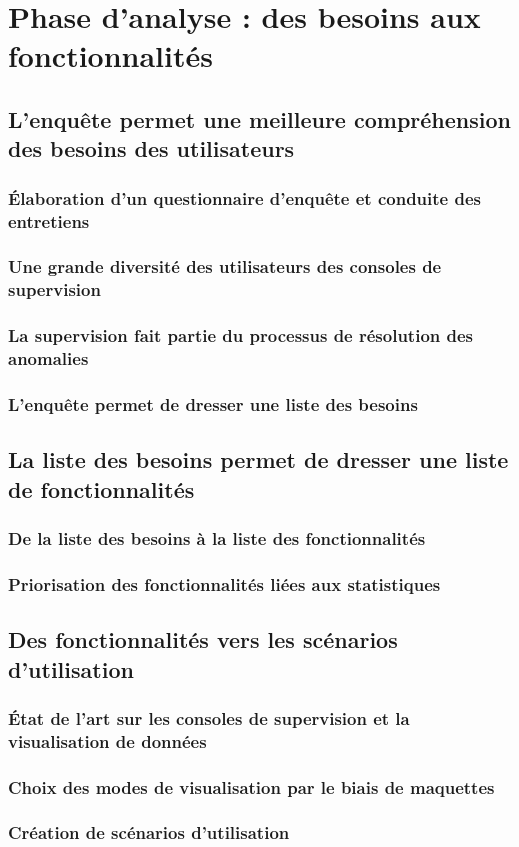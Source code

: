 \section{Phase d'analyse : des besoins aux fonctionnalités}

\subsection{L'enquête permet une meilleure compréhension des besoins des utilisateurs}
\subsubsection{Élaboration d'un questionnaire d'enquête et conduite des entretiens}
\subsubsection{Une grande diversité des utilisateurs des consoles de supervision}
\subsubsection{La supervision fait partie du processus de résolution des anomalies}
\subsubsection{L'enquête permet de dresser une liste des besoins}

\subsection{La liste des besoins permet de dresser une liste de fonctionnalités}
\subsubsection{De la liste des besoins à la liste des fonctionnalités}
\subsubsection{Priorisation des fonctionnalités liées aux statistiques}

\subsection{Des fonctionnalités vers les scénarios d'utilisation}
\subsubsection{État de l'art sur les consoles de supervision et la visualisation de données}
\subsubsection{Choix des modes de visualisation par le biais de maquettes}
\subsubsection{Création de scénarios d'utilisation}